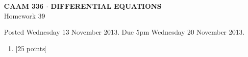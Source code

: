 \documentclass[10pt]{article}
\begin{document}
\vspace*{-5em}
\begin{center}
\large \textsf{\textbf{CAAM 336 $\cdot$ DIFFERENTIAL EQUATIONS}\\[0.5em]
Homework 39 }
\end{center}

Posted Wednesday 13 November 2013.  Due 5pm Wednesday 20 November 2013.

\begin{enumerate}\addtocounter{enumi}{38}
\item {[25 points]}  
\end{enumerate}
\end{document}
